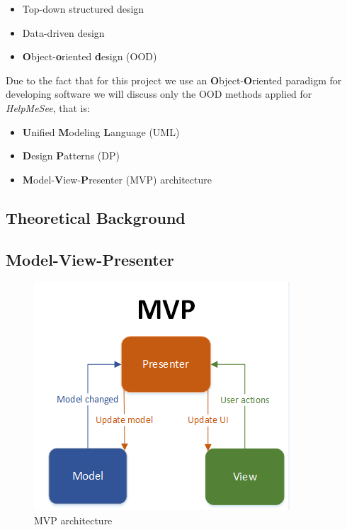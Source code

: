 \documentclass{article}[11]
\begin{document}

	\begin{itemize}
		\item Top-down structured design
		\item Data-driven design
		\item \textbf{O}bject-\textbf{o}riented \textbf{d}esign (OOD)
	\end{itemize}

	Due to the fact that for this project we use an \textbf{O}bject-\textbf{O}riented paradigm for developing software we will discuss only the OOD methods applied for \emph{HelpMeSee}, that is:
	
	\begin{itemize}
		\item \textbf{U}nified \textbf{M}odeling \textbf{L}anguage (UML)
		\item  \textbf{D}esign \textbf{P}atterns (DP)
		\item \textbf{M}odel-\textbf{V}iew-\textbf{P}resenter (MVP) architecture
	\end{itemize}
	

\newpage

\subsection{Theoretical Background}

	\subsection{Model-View-Presenter}
	
	\begin{figure}
		\centering
		\includegraphics{./imgs/MVP}
		\caption{MVP architecture \cite{MVPPhoto}}
	\end{figure}
	
\end{document}
